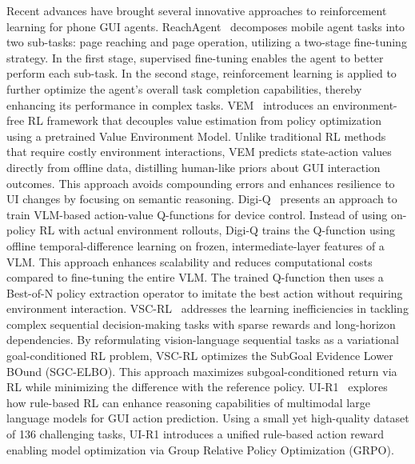 Recent advances have brought several innovative approaches to reinforcement learning for phone GUI agents. ReachAgent~\cite{wu2025reachagent} decomposes mobile agent tasks into two sub-tasks: page reaching and page operation, utilizing a two-stage fine-tuning strategy. In the first stage, supervised fine-tuning enables the agent to better perform each sub-task. In the second stage, reinforcement learning is applied to further optimize the agent's overall task completion capabilities, thereby enhancing its performance in complex tasks. VEM~\cite{zheng2025vem} introduces an environment-free RL framework that decouples value estimation from policy optimization using a pretrained Value Environment Model. Unlike traditional RL methods that require costly environment interactions, VEM predicts state-action values directly from offline data, distilling human-like priors about GUI interaction outcomes. This approach avoids compounding errors and enhances resilience to UI changes by focusing on semantic reasoning. Digi-Q~\cite{bai2025digi} presents an approach to train VLM-based action-value Q-functions for device control. Instead of using on-policy RL with actual environment rollouts, Digi-Q trains the Q-function using offline temporal-difference learning on frozen, intermediate-layer features of a VLM. This approach enhances scalability and reduces computational costs compared to fine-tuning the entire VLM. The trained Q-function then uses a Best-of-N policy extraction operator to imitate the best action without requiring environment interaction. VSC-RL~\cite{wu2025vsc} addresses the learning inefficiencies in tackling complex sequential decision-making tasks with sparse rewards and long-horizon dependencies. By reformulating vision-language sequential tasks as a variational goal-conditioned RL problem, VSC-RL optimizes the SubGoal Evidence Lower BOund (SGC-ELBO). This approach maximizes subgoal-conditioned return via RL while minimizing the difference with the reference policy. UI-R1~\cite{lu2025ui} explores how rule-based RL can enhance reasoning capabilities of multimodal large language models for GUI action prediction. Using a small yet high-quality dataset of 136 challenging tasks, UI-R1 introduces a unified rule-based action reward enabling model optimization via Group Relative Policy Optimization (GRPO).

